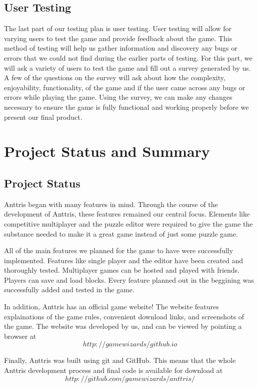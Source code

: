 \documentclass[12pt]{article}
\begin{document}
\subsection{User Testing}
The last part of our testing plan is user testing. User testing will allow for varying users to test the game and provide feedback about the game. This method of testing will help us gather information and discovery any bugs or errors that we could not find during the earlier parts of testing. For this part, we will ask a variety of users to test the game and fill out a survey generated by us. A few of the questions on the survey will ask about how the complexity, enjoyability, functionality, of the game and if the user came across any bugs or errors while playing the game. Using the survey, we can make any changes necessary to ensure the game is fully functional and working properly before we present our final product.

\section{Project Status and Summary}
\subsection{Project Status} %
Anttris began with many features in mind. Through the course of the development of Anttris, these features remained our central focus. Elements like competitive multiplayer and the puzzle editor were required to give the game the substance needed to make it a great game instead of just some puzzle game.

All of the main features we planned for the game to have were successfully implemented. Features like single player and the editor have been created and thoroughly tested. Multiplayer games can be hosted and played with friends. Players can save and load blocks. Every feature planned out in the beggining was successfully added and tested in the game.

In addition, Anttris has an official game website! The website features explainations of the game rules, convenient download links, and screenshots of the game. The website was developed by us, and can be viewed by pointing a browser at
$$
http://gamewizards/github.io
$$

Finally, Anttris was built using git and GitHub. This means that the whole Anttris development process and final code is available for download at
$$http://github.com/gamewizards/anttris/$$
\end{document}
